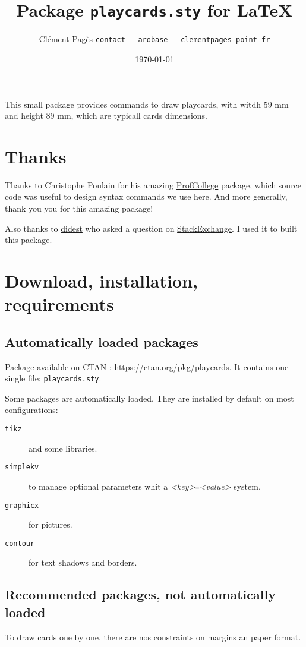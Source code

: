 \documentclass[a4paper, 12pt]{article}
\title{Package \texttt{playcards.sty} for \LaTeX}
\date{\today}
\author{Clément Pagès \texttt{contact -- arobase -- clementpages point fr}}
\newcommand{\package}[1]{\texttt{#1}}
\newcommand{\kv}[2]{\textit{<#1>}\texttt=\textit{<#2>}}
\begin{document}
\maketitle

This small package provides commands to draw playcards, with witdh 59 mm and height 89 mm, which are typicall cards dimensions.

\tableofcontents
\section*{Thanks}
Thanks to Christophe Poulain for his amazing \href{https://ctan.org/pkg/profcollege}{ProfCollege} package, which source code was useful to design syntax commands we use here. And more generally, thank you you for this amazing package!

Also thanks to \href{https://tex.stackexchange.com/users/1948/didest}{didest} who asked a question on \href{https://tex.stackexchange.com/questions/47924/creating-playing-cards-using-tikz}{StackExchange}. I used it to built this package.

\section{Download, installation, requirements}
	\subsection{Automatically loaded packages}
Package available on CTAN : \href{https://ctan.org/pkg/playcards}{https://ctan.org/pkg/playcards}. It contains one single file: \texttt{playcards.sty}.

Some packages are automatically loaded. They are installed by default on most configurations:
\begin{description}
	\item[\package{tikz}] and some libraries.
	\item[\package{simplekv}] to manage optional parameters whit a \kv{key}{value} system.
	\item[\package{graphicx}] for pictures. 
	\item[\package{contour}] for text shadows and borders.
\end{description}


	\subsection{Recommended packages, not automatically loaded}
To draw cards one by one, there are nos constraints on margins an paper format.
\end{document}

